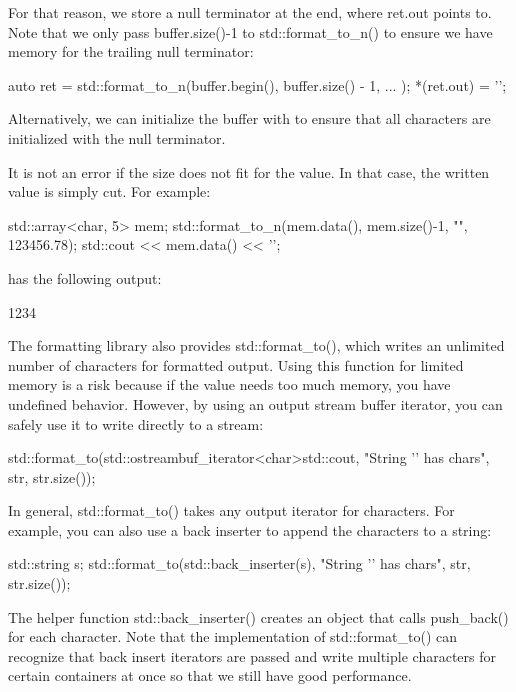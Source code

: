 For that reason, we store a null terminator at the end, where ret.out points to. Note that we only pass buffer.size()-1 to std::format\_to\_n() to ensure we have memory for the trailing null terminator:

\begin{cpp}
auto ret = std::format_to_n(buffer.begin(), buffer.size() - 1, ... );
*(ret.out) = '\0';
\end{cpp}

Alternatively, we can initialize the buffer with {} to ensure that all characters are initialized with the null terminator.

It is not an error if the size does not fit for the value. In that case, the written value is simply cut. For example:

\begin{cpp}
std::array<char, 5> mem{};
std::format_to_n(mem.data(), mem.size()-1, "{}", 123456.78);
std::cout << mem.data() << '\n';
\end{cpp}

has the following output:

\begin{shell}
1234
\end{shell}


The formatting library also provides std::format\_to(), which writes an unlimited number of characters for formatted output. Using this function for limited memory is a risk because if the value needs too much memory, you have undefined behavior. However, by using an output stream buffer iterator, you can safely use it to write directly to a stream:

\begin{cpp}
std::format_to(std::ostreambuf_iterator<char>{std::cout},
				"String '{}' has {} chars\n", str, str.size());
\end{cpp}

In general, std::format\_to() takes any output iterator for characters. For example, you can also use a back inserter to append the characters to a string:

\begin{cpp}
std::string s;
std::format_to(std::back_inserter(s),
				"String '{}' has {} chars\n", str, str.size());
\end{cpp}

The helper function std::back\_inserter() creates an object that calls push\_back() for each character. Note that the implementation of std::format\_to() can recognize that back insert iterators are passed and write multiple characters for certain containers at once so that we still have good performance.

